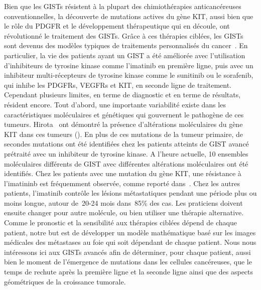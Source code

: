 \documentclass[main.tex]{subfiles}
\begin{document}
Bien que les GISTs résistent à la plupart des chimiothérapies anticancéreuses conventionnelles, 
la découverte de mutations actives du gène KIT, aussi bien que le rôle du PDGFR et le développement thérapeutique qui en découle, ont révolutionné le traitement des GISTs.
Grâce à ces thérapies ciblées, les GISTs sont devenus des modèles typiques de traitements personnalisés du cancer~\cite{Blay2012}. 
En particulier, la vie des patients ayant un GIST a été améliorée avec l'utilisation d'inhibiteurs de tyrosine kinase comme l'imatinib en première ligne, puis avec un inhibiteur multi-récepteurs de tyrosine kinase comme 
le sunitinib ou le sorafenib,  
qui inhibe les PDGFRs, VEGFRs et KIT, en seconde ligne de traitement. 
Cependant plusieurs limites, en terme de diagnostic et en terme de résultats, résident encore.
Tout d'abord, une importante variabilité existe dans les caractéristiques moléculaires et génétiques qui gouvernent le pathogène de ces tumeurs.
Hirota \etal\ ont démontré la présence d'altérations moléculaires du gène KIT dans ces tumeurs (\cf \cite{Hirota1998}). 
En plus de ces mutations de la tumeur primaire, de secondes mutations ont été identifiées chez les patients atteints de GIST avancé prétraité avec un inhibiteur de tyrosine kinase. A l'heure actuelle, 10 ensembles moléculaires différents de GIST avec différentes altérations moléculaires ont été identifiés. 
Chez les patients avec une mutation du gène KIT, une résistance à l'imatininb est fréquemment observée, comme reporté dans~\cite{Blay2011}. 
Chez les autres patients, l'imatinib contrôle les lésions métastatiques pendant une période plus ou moins longue, autour de~20-24 mois dans~85\% des cas. 
Les praticiens doivent ensuite changer pour autre molécule, ou bien utiliser une thérapie alternative. Comme le pronostic et la sensibilité aux thérapies ciblées dépend de chaque patient, notre but est de développer un modèle mathématique basé sur les images médicales des métastases au foie qui soit dépendant de chaque patient.
Nous nous intéressons ici aux GISTs avancés afin de déterminer, pour chaque patient, aussi bien le moment de l'émergence de mutations dans les cellules cancéreuses, que le temps de rechute après la première ligne et la seconde ligne ainsi que des aspects géométriques de la croissance tumorale.
\end{document}
